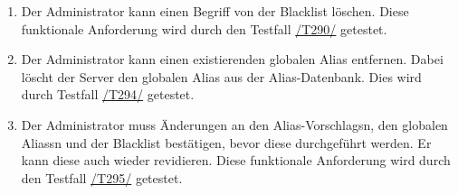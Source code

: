 \begin{enumerate}[start=101, label=\textbf{/FA\arabic*/}, align=left]
    \item \label{/FA110/} Der \Gls{Administrator} kann einen Begriff von der \Gls{Blacklist} löschen. Diese funktionale Anforderung wird durch den Testfall \hyperref[/T290/]{/T290/} getestet.
    \item \label{/FA111/} Der \Gls{Administrator} kann einen existierenden \gls{global}en \Gls{Alias} entfernen. Dabei löscht der \Gls{Server} den \gls{global}en \Gls{Alias} aus der \Gls{Alias}-\Gls{Datenbank}. Dies wird durch Testfall \hyperref[/T294/]{/T294/} getestet.
    \item \label{/FA112/} Der \Gls{Administrator} muss Änderungen an den \Glspl{Alias-Vorschlag}n, den \gls{global}en \Glspl{Alias}n und der \Gls{Blacklist} bestätigen, bevor diese durchgeführt werden. Er kann diese auch wieder revidieren. Diese funktionale Anforderung wird durch den Testfall \hyperref[/T295/]{/T295/} getestet.
\end{enumerate}